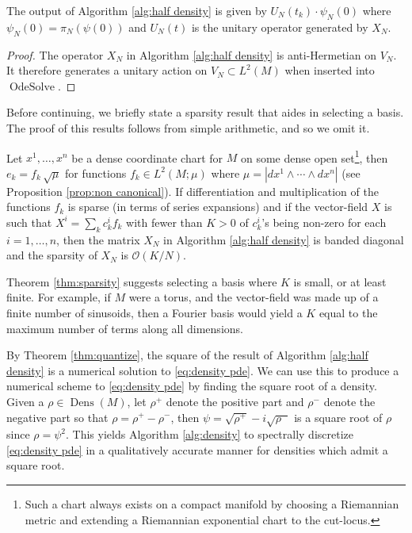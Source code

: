 \documentclass[final,leqno]{siamltex1213}
\DeclareMathOperator{\Dens}{Dens}
\begin{document}
\begin{proposition} \label{prop:unitary}
	The output of Algorithm \ref{alg:half density} is given by $U_{N}(t_{k}) \cdot \psi_{N}(0)$ where $\psi_{N}(0) = \pi_{N}( \psi(0) )$
	and $U_{N}(t)$ is the unitary operator generated by $X_{N}$.
\end{proposition}
\begin{proof}
	The operator $X_{N}$ in Algorithm \ref{alg:half density} is anti-Hermetian on $V_{N}$.
	It therefore generates a unitary action on $V_{N} \subset L^{2}(M)$ when inserted into $\operatorname{OdeSolve}$.
\end{proof}

Before continuing, we briefly state a sparsity result that aides in selecting a basis.
The proof of this results follows from simple arithmetic, and so we omit it.

\begin{theorem} \label{thm:sparsity}
	Let $x^{1},\dots,x^{n}$ be a dense coordinate chart for $M$ on some dense open set\footnote{Such a chart always exists on a compact manifold by choosing a Riemannian metric and extending a Riemannian exponential chart to the cut-locus.\cite{Sakai1996,MO_dense_charts} },
	then $e_{k}= f_{k} \, \sqrt{\mu}$ for functions $f_{k} \in L^2(M; \mu)$ where $\mu = | dx^{1} \wedge \cdots \wedge dx^{n}|$ (see Proposition \ref{prop:non canonical}).
	If differentiation and multiplication of the functions $f_{k}$ is sparse (in terms of series expansions) and 
	if the vector-field $X$ is such that $X^{i} = \sum_{k} c_{k}^{i} f_{k}$ with fewer than $K>0$ of $c^{i}_{k}$'s being non-zero for each $i=1,\dots,n$, then the matrix $X_{N}$ in Algorithm \ref{alg:half density} is banded diagonal and the sparsity of $X_{N}$ is $\mathcal{O}( K / N )$.
\end{theorem}

Theorem \ref{thm:sparsity} suggests selecting a basis where $K$ is small, or at least finite.
For example, if $M$ were a torus, and the vector-field was made up of a finite number of sinusoids, then a Fourier basis would yield a $K$ equal to the maximum number of terms along all dimensions.

By Theorem \ref{thm:quantize}, the square of the result of Algorithm \ref{alg:half density} is a numerical solution to \eqref{eq:density pde}.
We can use this to produce a numerical scheme to \eqref{eq:density pde} by finding the square root of a density.
Given a $\rho \in \Dens(M)$, let $\rho^{+}$ denote the positive part and $\rho^{-}$ denote the negative part so that $\rho = \rho^{+} - \rho^{-}$, 
then $\psi = \sqrt{\rho^{+}} - i \sqrt{\rho^{-}}$ is a square root of $\rho$ since $\rho = \psi^{2}$.
This yields Algorithm \ref{alg:density} to spectrally discretize \eqref{eq:density pde} in a qualitatively accurate manner for densities which admit a square root.
\end{document}
